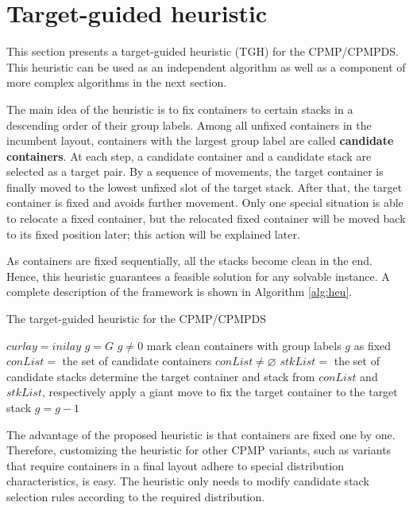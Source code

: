 \documentclass[review,3p,times,authoryear,12pt]{elsarticle}
\begin{document}
\section{Target-guided heuristic}
\label{sec:heu}

This section presents a target-guided heuristic (TGH) for the CPMP/CPMPDS.
This heuristic can be used as an independent algorithm as well as a component of more complex algorithms in the next section.

The main idea of the heuristic is to fix containers to certain stacks in a descending order of their group labels.
Among all unfixed containers in the incumbent layout, containers with the largest group label are called \textbf{candidate containers}.
At each step, a candidate container and a candidate stack are selected as a target pair.
By a sequence of movements, the target container is finally moved to the lowest unfixed slot of the target stack.
After that, the target container is fixed and avoids further movement.
Only one special situation is able to relocate a fixed container, but the relocated fixed container will be moved back to its fixed position later; this action will be explained later.

As containers are fixed sequentially, all the stacks become clean in the end.
Hence, this heuristic guarantees a feasible solution for any solvable instance.
A complete description of the framework is shown in Algorithm \ref{alg:heu}.

\begin{algorithm*}[!htb]
	\caption{The target-guided heuristic for the CPMP/CPMPDS}
	\label{alg:heu}
	\begin{codebox}
	\li $\mathit{curlay} = \mathit{inilay}$
    \li $\mathit{g} = G$
    \li \While $g\neq0$
    \li \Do
            mark clean containers with group labels $g$ as fixed\label{heu:c}
    \li     $\mathit{conList} = $ the set of candidate containers
    \li     \While $\mathit{conList} \neq \varnothing$\label{heu:l}
    \li     \Do
                $\mathit{stkList} = $ the set of candidate stacks
    \li         determine the target container and stack from $\mathit{conList}$ and $\mathit{stkList}$, respectively
    \li         apply a giant move to fix the target container to the target stack
            \End
    \li $g=g-1$
        \End
	\end{codebox}
\end{algorithm*}


The advantage of the proposed heuristic is that containers are fixed one by one.
Therefore, customizing the heuristic for other CPMP variants, such as variants that require containers in a final layout adhere to special distribution characteristics, is easy.
The heuristic only needs to modify candidate stack selection rules according to the required distribution.
\end{document}
